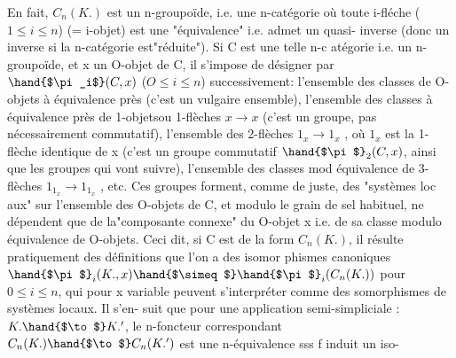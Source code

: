 En fait, $C_n(K.)$ est un n-groupoïde, i.e. une n-catégorie où toute
i-fléche ($1\leq i\leq n$) (= i-objet) est une "équivalence" i.e. admet un quasi-%
inverse (donc un inverse si la n-catégorie est"réduite"). Si C est une
telle n-c atégorie i.e. un n-groupoïde, et x un O-objet de C, il s'impose
de désigner par $\hand{$\pi_i$}(C,x)$ ($O\leq i\leq n$) successivement: l'ensemble des classes
de O-objets à équivalence près (c'est un vulgaire ensemble), l'ensemble des
classes à équivalence près de 1-objets\hand{(}ou 1-flèches\hand{)} $x \to x$ (c'est un groupe,
pas nécessairement commutatif), l'ensemble des 2-flèches $1_x \to 1_x$ , où $1_x$
est la 1-flèche identique de x (c'est un groupe commutatif $\hand{$\pi$}_2(C,x)$, ainsi
que les groupes qui vont suivre), l'ensemble des classes mod équivalence
de 3-flèches $1_{1_x} \longrightarrow 1_{1_x}$ , etc. Ces groupes forment, comme de juste, des
"systèmes loc aux" sur l'ensemble des O-objets de C, et modulo le grain de
sel habituel, ne dépendent que de la"composante connexe" du O-objet x i.e.
de sa classe modulo équivalence de O-objets. Ceci dit, si C est de la form
$C_n(K.)$, il résulte pratiquement des définitions que  l'on a des isomor%
phismes canoniques $\hand{$\pi$}_i(K.,x)\hand{$\simeq$}\hand{$\pi$}_i(C_n(K.))$ pour $0\leq i\leq n$, qui pour x variable
peuvent s'interpréter comme des somorphismes de systèmes locaux. Il s'en-%
suit que pour une application semi-simpliciale :$K. \hand{$\to$} K.'$, le n-foncteur
correspondant $C_n(K.) \hand{$\to$} C_n(K.')$ est une n-équivalence sss f induit un iso-%

